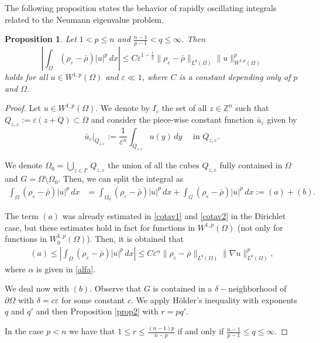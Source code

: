 \documentclass[12pt]{amsart}
\newtheorem{prop}[thm]{Proposition}
\theoremstyle{definition}
\theoremstyle{remark}
\numberwithin{equation}{section}
\begin{document}
The following proposition states the behavior of rapidly oscillating integrals  related to the Neumann eigenvalue problem.
\begin{prop} \label{prop.neumann}
Let  $1<p\leq n$ and $\frac{n-1}{p-1}< q \leq \infty$. Then
$$
\left|\int_\Omega(\rho_\varepsilon-\bar\rho) |u|^p\,dx \right|  \leq   C \varepsilon^{1-\frac1q} \|\rho_\varepsilon - \bar \rho\|_{L^q(\Omega)}  \|   u\|_{W^{1,p}(\Omega)}^p
$$
holds for all $u\in W^{1,p}(\Omega)$ and $\varepsilon\ll 1$,  where $C$ is a constant depending only of $p$  and $\Omega$.
\end{prop}

\begin{proof}
Let $u\in W^{1,p}(\Omega)$. We denote by $I_\varepsilon$ the set of all $z\in \mathbb{Z}^n$ such that $Q_{z,\varepsilon}:=\varepsilon (z+Q)\subset \Omega$ and consider the piece-wise constant function $\bar u_\varepsilon$ given by
$$
\bar u_\varepsilon\big|_{Q_{z,\varepsilon}} :=\frac{1}{\varepsilon^n}\int_{Q_{z,\varepsilon}} u(y)\,dy \quad \text{ in }Q_{z,\varepsilon}.
$$


We denote $\Omega_0=\bigcup_{z\in I^\varepsilon} Q_{z,\varepsilon}$ the union of all the cubes $Q_{z,\varepsilon}$ fully contained in $\Omega$ and $G=\Omega\setminus \Omega_0$. Then, we can split the integral as
\begin{align*}
\int_\Omega (\rho_\varepsilon-\bar \rho) |u|^p \,dx &= \int_{\Omega_0} (\rho_\varepsilon-\bar \rho) |u|^p  \,dx
 + \int_G (\rho_\varepsilon-\bar \rho) |u|^p \,dx:=(a)+(b).
\end{align*}

The term $(a)$ was already estimated in \eqref{cotav1} and \eqref{cotav2} in the Dirichlet case, but these estimates hold in fact for functions in $W^{1,p}(\Omega)$ (not only for functions in $W^{1,p}_0(\Omega)$). Then, it is obtained that
\begin{align*}
(a)\leq \left|\int_\Omega(\rho_\varepsilon-\bar\rho) |u|^p \,dx \right|  \leq   C \varepsilon^\alpha \|\rho_\varepsilon - \bar \rho\|_{L^q(\Omega)}   \|\nabla u\|_{L^{p}(\Omega)}^p, 
\end{align*}
where $\alpha$ is given in \eqref{alfa}.

We deal now with $(b)$. Observe that $G$ is contained in a $\delta-$neighborhood of $\partial\Omega$ with $\delta=c\varepsilon$ for some constant $c$. We apply H\"older's inequality with exponents $q$ and $q'$ and then Proposition  \ref{prop2} with $r=pq'$. 

In the case $p<n$ we have that $1\leq r \leq \frac{(n-1)p}{n-p}$ if and only if $\frac{n-1}{p-1}\leq q\leq \infty$.


\end{proof}
\end{document}

